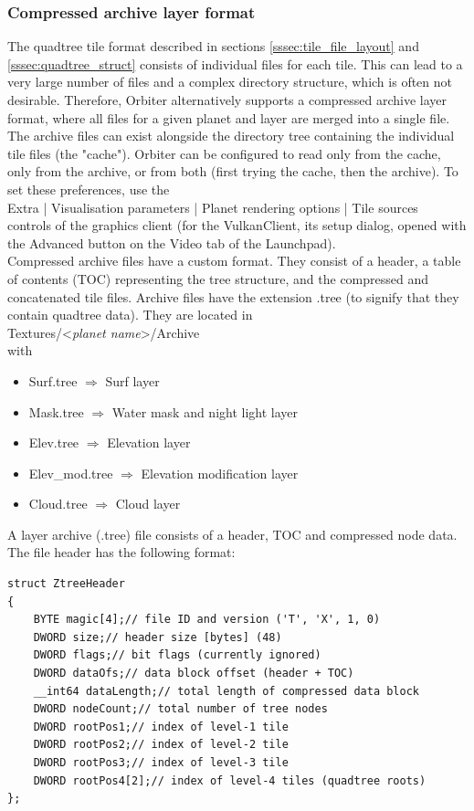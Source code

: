 \documentclass[Orbiter Developer Manual.tex]{subfiles}
\begin{document}
\subsubsection{Compressed archive layer format}
\label{sssec:compress_archive_layer}
The quadtree tile format described in sections \ref{sssec:tile_file_layout} and \ref{sssec:quadtree_struct} consists of individual files for each tile. This can lead to a very large number of files and a complex directory structure, which is often not desirable. Therefore, Orbiter alternatively supports a compressed archive layer format, where all files for a given planet and layer are merged into a single file.\\
The archive files can exist alongside the directory tree containing the individual tile files (the "cache"). Orbiter can be configured to read only from the cache, only from the archive, or from both (first trying the cache, then the archive). To set these preferences, use the\\
\indent Extra | Visualisation parameters | Planet rendering options | Tile sources\\
controls of the graphics client (for the VulkanClient, its setup dialog, opened with the Advanced button on the Video tab of the Launchpad).\\
Compressed archive files have a custom format. They consist of a header, a table of contents (TOC) representing the tree structure, and the compressed and concatenated tile files. Archive files have the extension .tree (to signify that they contain quadtree data). They are located in\\
\indent Textures/<\textit{planet name}>/Archive\\
with

\begin{itemize}
\item Surf.tree $\Rightarrow$ Surf layer
\item Mask.tree $\Rightarrow$ Water mask and night light layer
\item Elev.tree $\Rightarrow$ Elevation layer
\item Elev\_mod.tree $\Rightarrow$ Elevation modification layer
\item Cloud.tree $\Rightarrow$ Cloud layer
\end{itemize}

\noindent
A layer archive (.tree) file consists of a header, TOC and compressed node data. The file header has the following format:

\begin{lstlisting}
struct ZtreeHeader
{
	BYTE magic[4];// file ID and version ('T', 'X', 1, 0)
	DWORD size;// header size [bytes] (48)
	DWORD flags;// bit flags (currently ignored)
	DWORD dataOfs;// data block offset (header + TOC)
	__int64 dataLength;// total length of compressed data block
	DWORD nodeCount;// total number of tree nodes
	DWORD rootPos1;// index of level-1 tile
	DWORD rootPos2;// index of level-2 tile
	DWORD rootPos3;// index of level-3 tile
	DWORD rootPos4[2];// index of level-4 tiles (quadtree roots)
};
\end{lstlisting}
\end{document}
